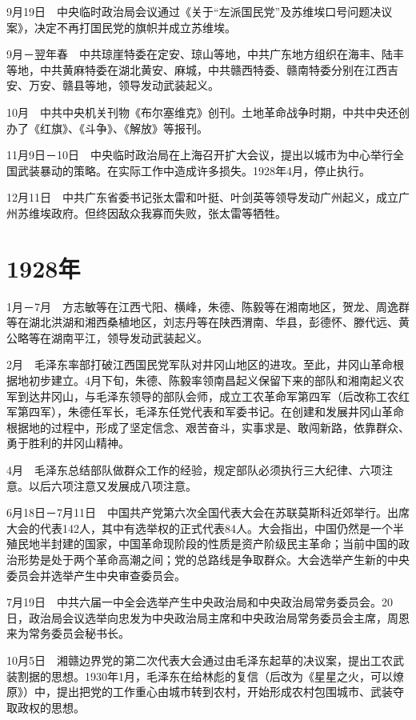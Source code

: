 \documentclass[10pt,a4paper,twocolumn]{book}
\begin{document}
9月19日　中央临时政治局会议通过《关于“左派国民党”及苏维埃口号问题决议案》，决定不再打国民党的旗帜并成立苏维埃。

9月－翌年春　中共琼崖特委在定安、琼山等地，中共广东地方组织在海丰、陆丰等地，中共黄麻特委在湖北黄安、麻城，中共赣西特委、赣南特委分别在江西吉安、万安、赣县等地，领导发动武装起义。

10月　中共中央机关刊物《布尔塞维克》创刊。土地革命战争时期，中共中央还创办了《红旗》、《斗争》、《解放》等报刊。

11月9日－10日　中央临时政治局在上海召开扩大会议，提出以城市为中心举行全国武装暴动的策略。在实际工作中造成许多损失。1928年4月，停止执行。

12月11日　中共广东省委书记张太雷和叶挺、叶剑英等领导发动广州起义，成立广州苏维埃政府。但终因敌众我寡而失败，张太雷等牺牲。

\section{1928年}

1月－7月　方志敏等在江西弋阳、横峰，朱德、陈毅等在湘南地区，贺龙、周逸群等在湖北洪湖和湘西桑植地区，刘志丹等在陕西渭南、华县，彭德怀、滕代远、黄公略等在湖南平江，领导发动武装起义。

2月　毛泽东率部打破江西国民党军队对井冈山地区的进攻。至此，井冈山革命根据地初步建立。4月下旬，朱德、陈毅率领南昌起义保留下来的部队和湘南起义农军到达井冈山，与毛泽东领导的部队会师，成立工农革命军第四军（后改称工农红军第四军），朱德任军长，毛泽东任党代表和军委书记。在创建和发展井冈山革命根据地的过程中，形成了坚定信念、艰苦奋斗，实事求是、敢闯新路，依靠群众、勇于胜利的井冈山精神。

4月　毛泽东总结部队做群众工作的经验，规定部队必须执行三大纪律、六项注意。以后六项注意又发展成八项注意。

6月18日－7月11日　中国共产党第六次全国代表大会在苏联莫斯科近郊举行。出席大会的代表142人，其中有选举权的正式代表84人。大会指出，中国仍然是一个半殖民地半封建的国家，中国革命现阶段的性质是资产阶级民主革命；当前中国的政治形势是处于两个革命高潮之间；党的总路线是争取群众。大会选举产生新的中央委员会并选举产生中央审查委员会。

7月19日　中共六届一中全会选举产生中央政治局和中央政治局常务委员会。20日，政治局会议选举向忠发为中央政治局主席和中央政治局常务委员会主席，周恩来为常务委员会秘书长。

10月5日　湘赣边界党的第二次代表大会通过由毛泽东起草的决议案，提出工农武装割据的思想。1930年1月，毛泽东在给林彪的复信（后改为《星星之火，可以燎原》）中，提出把党的工作重心由城市转到农村，开始形成农村包围城市、武装夺取政权的思想。
\end{document}
